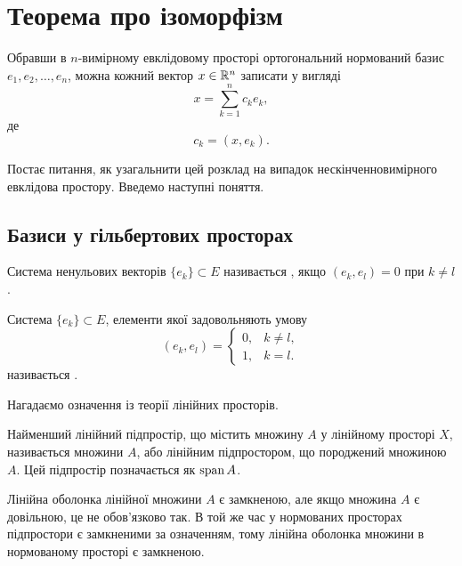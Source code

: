 \chapter{Теорема про ізоморфізм}

Обравши в $n$-вимірному евклідовому просторі
ортогональний нормований базис $e_1, e_2, \dots, e_n$, можна
кожний вектор
$x \in \mathbb{R}^n$ записати у вигляді
\begin{equation*}
    x = \sum_{k = 1}^n c_k e_k,
\end{equation*}
де 
\begin{equation*}
    c_k = (x, e_k).
\end{equation*}

Постає питання, як узагальнити цей розклад на випадок
нескінченновимірного евклідова простору. Введемо
наступні поняття.

\section{Базиси у гільбертових просторах}

\begin{definition}
Система ненульових векторів $\{e_k\} \subset E$
називається , якщо
$(e_k, e_l) = 0$ при $k \ne l$.
\end{definition}

\begin{definition}
Система $\{e_k\} \subset E$, елементи якої
задовольняють умову
\begin{equation*}
    (e_k, e_l) = \begin{cases}
        0, & k \ne l, \\
        1, & k = l.
    \end{cases}
\end{equation*}
називається .
\end{definition}

Нагадаємо означення із теорії лінійних просторів.

\begin{definition}
Найменший лінійний підпростір, що містить
множину $A$ у лінійному просторі $X$, називається
 множини $A$, або лінійним
підпростором, що породжений множиною $A$. Цей
підпростір позначається як $\operatorname{span} A$.
\end{definition}

\begin{remark}
Лінійна оболонка лінійної множини $A$
є замкненою, але якщо множина $A$ є довільною, це не
обов’язково так. В той же час у нормованих просторах
підпростори є замкненими за означенням, тому лінійна
оболонка множини в нормованому просторі є замкненою.
\end{remark}

